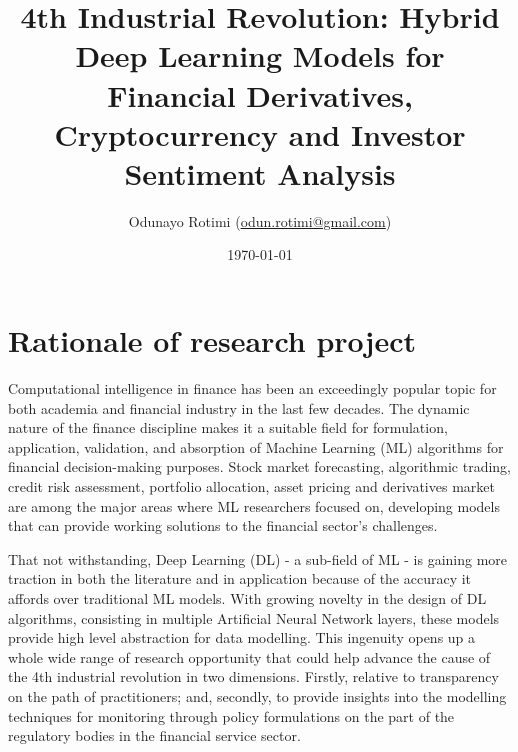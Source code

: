 \documentclass[a4paper,11pt]{scrartcl}
\title{4th Industrial Revolution: 
Hybrid Deep Learning Models for Financial Derivatives, 
Cryptocurrency and Investor Sentiment Analysis}
\author{Odunayo Rotimi (\url{odun.rotimi@gmail.com})}
\date{\today}
\begin{document}
\maketitle


%
\section{Rationale of research project}
Computational intelligence in finance has been an exceedingly popular topic for both academia and financial
industry in the last few decades. The dynamic nature of the finance discipline makes it a suitable field for
formulation, application, validation, and absorption of Machine Learning (ML) algorithms for financial
decision-making purposes. Stock market forecasting, algorithmic trading, credit risk assessment,
portfolio allocation, asset pricing and derivatives market are among the major areas where ML researchers
focused on, developing models that can provide working solutions to the financial sector's challenges.
\newline

That not withstanding, Deep Learning (DL) - a sub-field of ML - is gaining more traction in both the
literature and in application because of the accuracy it affords over traditional ML models. With growing
novelty in the design of DL algorithms, consisting in multiple Artificial Neural Network layers, these models provide high level
abstraction for data modelling. This ingenuity opens up a whole wide range of research opportunity that
could help advance the cause of the 4th industrial revolution in two dimensions. Firstly, relative to
transparency on the path of practitioners; and, secondly, to provide insights into the modelling techniques
for monitoring through policy formulations on the part of the regulatory bodies in the financial service sector.


%
\end{document}
